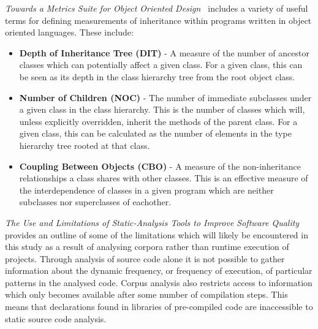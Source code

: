 \textit{Towards a Metrics Suite for Object Oriented Design~\cite{MetricsSuite}} includes a variety of useful terms for defining measurements of inheritance within programs written in object oriented languages. These include:
\begin{itemize}
	\item \textbf{Depth of Inheritance Tree (DIT)} - A measure of the number of ancestor classes which can potentially affect a given class. For a given class, this can be seen as its depth in the class hierarchy tree from the root object class.
	\item \textbf{Number of Children (NOC)} - The number of immediate subclasses under a given class in the class hierarchy. This is the number of classes which will, unless explicitly overridden, inherit the methods of the parent class. For a given class, this can be calculated as the number of elements in the type hierarchy tree rooted at that class.
	\item \textbf{Coupling Between Objects (CBO)} - A measure of the non-inheritance relationships a class shares with other classes. This is an effective measure of the interdependence of classes in a given program which are neither subclasses nor superclasses of eachother.
	\newline
\end{itemize}

\textit{The Use and Limitations of Static-Analysis Tools to Improve Software Quality~\cite{StaticAnalysisLimits}} provides an outline of some of the limitations which will likely be encountered in this study as a result of analysing corpora rather than runtime execution of projects. Through analysis of source code alone it is not possible to gather information about the dynamic frequency, or frequency of execution, of particular patterns in the analysed code. Corpus analysis also restricts access to information which only becomes available after some number of compilation steps. This means that declarations found in libraries of pre-compiled code are inaccessible to static source code analysis.





